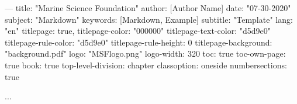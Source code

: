 ---
title: "Marine Science Foundation"
author: [Author Name]
date: "07-30-2020"
subject: "Markdown"
keywords: [Markdown, Example]
subtitle: "Template"
lang: "en"
titlepage: true,
titlepage-color: "000000"
titlepage-text-color: "d5d9e0"
titlepage-rule-color: "d5d9e0"
titlepage-rule-height: 0
titlepage-background: "background.pdf"
logo: "MSFlogo.png"
logo-width: 320
toc: true
toc-own-page: true
book: true
top-level-division: chapter
classoption: oneside
numbersections: true

...
